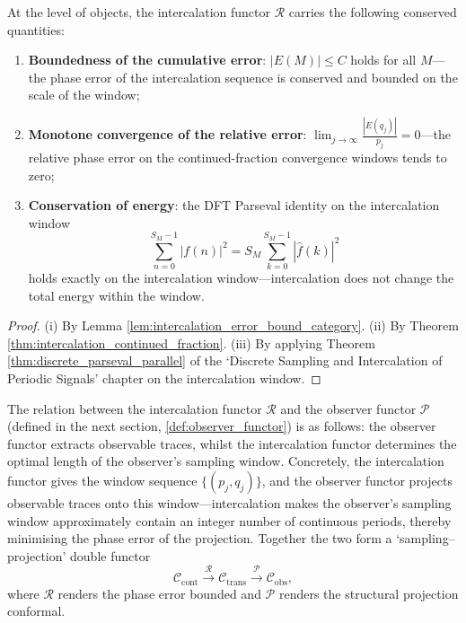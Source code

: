 \begin{proposition}\label{prop:intercalation_conservation}
At the level of objects, the intercalation functor $\mathcal{R}$ carries the following conserved quantities:
\begin{enumerate}[label=(\roman*)]
    \item \textbf{Boundedness of the cumulative error}: $|E(M)|\le C$ holds for all $M$---the phase error of the intercalation sequence is conserved and bounded on the scale of the window;
    \item \textbf{Monotone convergence of the relative error}: $\displaystyle\lim_{j\to\infty}\frac{|E(q_j)|}{p_j}=0$---the relative phase error on the continued-fraction convergence windows tends to zero;
    \item \textbf{Conservation of energy}: the DFT Parseval identity on the intercalation window
    \[
    \sum_{n=0}^{S_M-1}|f(n)|^2=S_M\sum_{k=0}^{S_M-1}|\hat{f}(k)|^2
    \]
    holds exactly on the intercalation window---intercalation does not change the total energy within the window.
\end{enumerate}
\end{proposition}

\begin{proof}
(i) By Lemma \ref{lem:intercalation_error_bound_category}. (ii) By Theorem \ref{thm:intercalation_continued_fraction}. (iii) By applying Theorem \ref{thm:discrete_parseval_parallel} of the `Discrete Sampling and Intercalation of Periodic Signals' chapter on the intercalation window.
\end{proof}

\begin{remark}\label{rem:intercalation_observer_interface}
The relation between the intercalation functor $\mathcal{R}$ and the observer functor $\mathcal{P}$ (defined in the next section, \ref{def:observer_functor}) is as follows: the observer functor extracts observable traces, whilst the intercalation functor determines the optimal length of the observer's sampling window. Concretely, the intercalation functor gives the window sequence $\{(p_j,q_j)\}$, and the observer functor projects observable traces onto this window---intercalation makes the observer's sampling window approximately contain an integer number of continuous periods, thereby minimising the phase error of the projection. Together the two form a `sampling--projection' double functor
\[
\mathcal{C}_{\text{cont}}\xrightarrow{\mathcal{R}}\mathcal{C}_{\text{trans}}\xrightarrow{\mathcal{P}}\mathcal{C}_{\text{obs}},
\]
where $\mathcal{R}$ renders the phase error bounded and $\mathcal{P}$ renders the structural projection conformal.
\end{remark}

